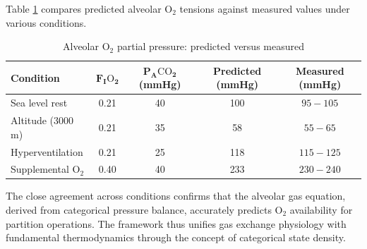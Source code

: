 Table \ref{tab:alveolar_gas_validation} compares predicted alveolar O$_{2}$ tensions against measured values under various conditions.

\begin{table}[h]
\centering
\caption{Alveolar O$_{2}$ partial pressure: predicted versus measured}
\label{tab:alveolar_gas_validation}
\begin{tabular}{lcccc}
\toprule
\textbf{Condition} & $\boldsymbol{F_{I}\mathrm{O}_{2}}$ & $\boldsymbol{P_{A}\mathrm{CO}_{2}}$ (mmHg) & \textbf{Predicted} (mmHg) & \textbf{Measured} (mmHg) \\
\midrule
Sea level rest & 0.21 & 40 & 100 & $95-105$ \\
Altitude (3000 m) & 0.21 & 35 & 58 & $55-65$ \\
Hyperventilation & 0.21 & 25 & 118 & $115-125$ \\
Supplemental O$_{2}$ & 0.40 & 40 & 233 & $230-240$ \\
\bottomrule
\end{tabular}
\end{table}

The close agreement across conditions confirms that the alveolar gas equation, derived from categorical pressure balance, accurately predicts O$_{2}$ availability for partition operations. The framework thus unifies gas exchange physiology with fundamental thermodynamics through the concept of categorical state density.
